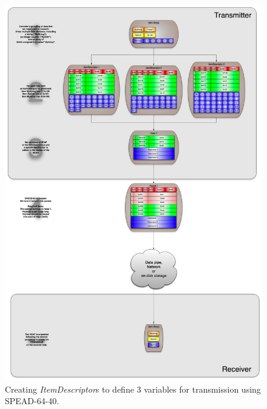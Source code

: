 \documentclass[11pt,english,twoside]{article}
\begin{document}
\begin{figure}[!htb]
\centering
\includegraphics[width=15cm]{images/Spead_itemdescriptor_transmit2}
\caption[Example \emph{ItemDescriptor} exchange]{\label{fig:desc_transmit}\small Creating \emph{ItemDescriptor}s to define 3 variables for
transmission using SPEAD-64-40.}
\end{figure}
\end{document}
